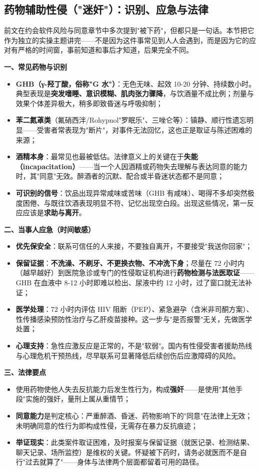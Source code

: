 \subsection{药物辅助性侵（"迷奸"）：识别、应急与法律}

前文在约会软件风险与同意章节中多次提到"被下药"，但都只是一句话。本节把它作为独立的实操主题讲完——不是因为这件事常见到人人会遇到，而是因为它的应对有严格的时间窗，事前知道和事后才知道，后果完全不同。

\textbf{一、常见药物与识别}
\begin{itemize}
\item \textbf{GHB（γ-羟丁酸，俗称"G 水"）}：无色无味、起效 10-20 分钟、持续数小时。典型表现是\textbf{突发嗜睡、意识模糊、肌肉张力骤降}，与饮酒量不成比例；剂量与效果个体差异极大，稍多即致昏迷与呼吸抑制；
\item \textbf{苯二氮䓬类}（氟硝西泮/Rohypnol"罗眠乐"、三唑仑等）：镇静、顺行性遗忘明显——受害者常表现为"断片"，对事件无法回忆，这也正是取证与陈述困难的来源；
\item \textbf{酒精本身}：最常见也最被低估。法律意义上的关键在于\textbf{失能（incapacitation）}——当一个人因酒精或药物失去理解与表达同意的能力时，其"同意"无效。醉酒者的沉默、配合或半昏迷状态都不是同意；
\item \textbf{可识别的信号}：饮品出现异常咸味或苦味（GHB 有咸味）、喝得不多却突然极度困倦、与既往饮酒表现明显不符、记忆出现空白段。出现这些情况，第一反应应该是\textbf{求助与离开}。
\end{itemize}

\textbf{二、当事人应急（时间敏感）}
\begin{itemize}
\item \textbf{优先保安全}：联系可信任的人来接，不要独自离开，不要接受"我送你回家"；
\item \textbf{保留证据}：\textbf{不洗澡、不刷牙、不更换衣物、不冲洗下身}；尽量在 72 小时内（越早越好）到医院急诊或专门的性侵取证机构进行\textbf{药物检测与法医取证}——GHB 在血液中 8-12 小时即难以检出、尿液中约 12 小时，过了窗口就无法补证；
\item \textbf{医学处理}：72 小时内评估 HIV 阻断（PEP）、紧急避孕（含米非司酮方案）、性传播感染预防性治疗与乙肝疫苗接种。这一步与"是否报警"无关，先做医学处置；
\item \textbf{心理支持}：急性应激反应是正常的，不是"软弱"。国内有性侵受害者援助热线与心理危机干预热线，尽早联系可显著降低后续创伤后应激障碍的风险。
\end{itemize}

\textbf{三、法律要点}
\begin{itemize}
\item 使用药物使他人失去反抗能力后发生性行为，构成\textbf{强奸}——是使用"其他手段"实施的强奸，量刑上属从重情节；
\item \textbf{同意能力}是判定核心：严重醉酒、昏迷、药物影响下的"同意"在法律上无效；未明确同意的性行为即构成性侵，无需存在暴力反抗痕迹；
\item \textbf{举证现实}：此类案件取证困难，及时报案与保留证据（就医记录、检测结果、聊天记录、场所监控）是维权的关键。怀疑被下药时，请务必就医而不是自行"过去就算了"——身体与法律两个层面都留着可用的路径。
\end{itemize}
